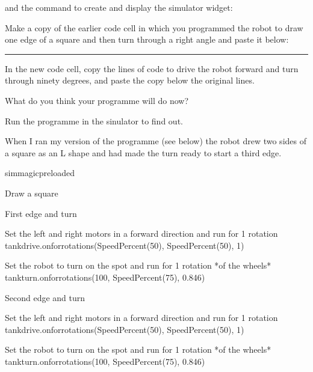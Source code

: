 \documentclass[letterpaper,10pt,english]{sphinxmanual}
\begin{document}
and the command to create and display the simulator widget:

\begin{sphinxVerbatim}[commandchars=\\\{\}]
  
\end{sphinxVerbatim}


Make a copy of the earlier code cell in which you programmed the robot to draw one edge of a square and then turn through a right angle and paste it below:


\bigskip\hrule\bigskip


In the new code cell, copy the lines of code to drive the robot forward and turn through ninety degrees, and paste the copy below the original lines.

What do you think your programme will do now?

Run the programme in the sinulator to find out.


When I ran my version of the programme (see below) the robot drew two sides of a square as an L shape and had made the turn ready to start a third edge.

{
\begin{sphinxVerbatim}[commandchars=\\\{\}]
\llap{\color{nbsphinxin}[ ]:\,\hspace{\fboxrule}\hspace{\fboxsep}}\PYGZpc{}\PYGZpc{}sim\PYGZus{}magic\PYGZus{}preloaded

\PYGZsh{} Draw a square


\PYGZsh{} First edge and turn

\PYGZsh{} Set the left and right motors in a forward direction
\PYGZsh{} and run for 1 rotation
tank\PYGZus{}drive.on\PYGZus{}for\PYGZus{}rotations(SpeedPercent(50), SpeedPercent(50), 1)

\PYGZsh{} Set the robot to turn on the spot
\PYGZsh{} and run for 1 rotation *of the wheels*
tank\PYGZus{}turn.on\PYGZus{}for\PYGZus{}rotations(\PYGZhy{}100, SpeedPercent(75), 0.846)



\PYGZsh{} Second edge and turn

\PYGZsh{} Set the left and right motors in a forward direction
\PYGZsh{} and run for 1 rotation
tank\PYGZus{}drive.on\PYGZus{}for\PYGZus{}rotations(SpeedPercent(50), SpeedPercent(50), 1)


\PYGZsh{} Set the robot to turn on the spot
\PYGZsh{} and run for 1 rotation *of the wheels*
tank\PYGZus{}turn.on\PYGZus{}for\PYGZus{}rotations(\PYGZhy{}100, SpeedPercent(75), 0.846)
\end{sphinxVerbatim}
}
\end{document}
